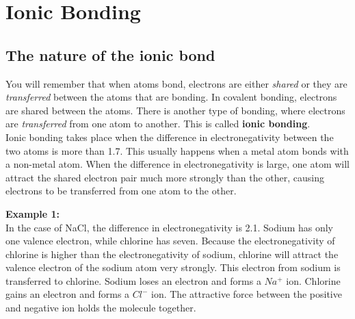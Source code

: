 



\section{Ionic Bonding}

\subsection{The nature of the ionic bond}

You will remember that when atoms bond, electrons are either \textit{shared} or they are \textit{transferred} between the atoms that are bonding. In covalent bonding, electrons are shared between the atoms. There is another type of bonding, where electrons are \textit{transferred} from one atom to another. This is called \textbf{ionic bonding}.\\

Ionic bonding takes place when the difference in electronegativity between the two atoms is more than 1.7. This usually happens when a metal atom bonds with a non-metal atom. When the difference in electronegativity is large, one atom will attract the shared electron pair much more strongly than the other, causing electrons to be transferred from one atom to the other.


\textbf{Example 1:}\\

In the case of NaCl, the difference in electronegativity is 2.1. Sodium has only one valence electron, while chlorine has seven. Because the electronegativity of chlorine is higher than the electronegativity of sodium, chlorine will attract the valence electron of the sodium atom very strongly. This electron from sodium is transferred to chlorine. Sodium loses an electron and forms a $Na^{+}$ ion. Chlorine gains an electron and forms a $Cl^{-}$ ion. The attractive force between the positive and negative ion holds the molecule together.\\

